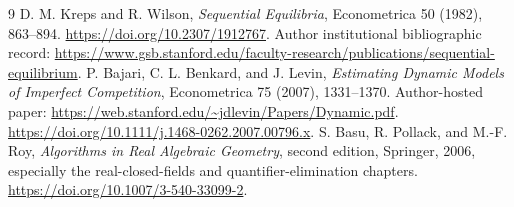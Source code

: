 \documentclass[11pt]{article}
\theoremstyle{remark}\newtheorem{remark}[theorem]{Remark}
\begin{document}
\begin{thebibliography}{9}
 D. M. Kreps and R. Wilson, \emph{Sequential Equilibria}, Econometrica 50 (1982), 863--894. \url{https://doi.org/10.2307/1912767}. Author institutional bibliographic record: \url{https://www.gsb.stanford.edu/faculty-research/publications/sequential-equilibrium}.
 P. Bajari, C. L. Benkard, and J. Levin, \emph{Estimating Dynamic Models of Imperfect Competition}, Econometrica 75 (2007), 1331--1370. Author-hosted paper: \url{https://web.stanford.edu/~jdlevin/Papers/Dynamic.pdf}. \url{https://doi.org/10.1111/j.1468-0262.2007.00796.x}.
 S. Basu, R. Pollack, and M.-F. Roy, \emph{Algorithms in Real Algebraic Geometry}, second edition, Springer, 2006, especially the real-closed-fields and quantifier-elimination chapters. \url{https://doi.org/10.1007/3-540-33099-2}.
\end{thebibliography}
\end{document}
